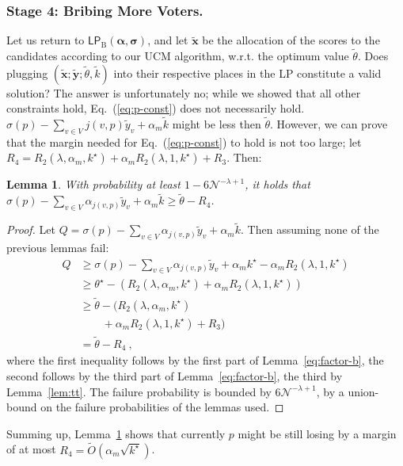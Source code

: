 \documentclass[letterpaper]{article} %
\newtheorem{lemma}[theorem]{Lemma}
\theoremstyle{definition}
\newcommand{\NN}{\mathcal{N}}
\newcommand\vecc{\mathbf}
\newcommand\vecgreek{\bm}
\newcommand{\veca}{\vecgreek{\alpha}}
\newcommand{\vecs}{\vecgreek{\sigma}}
\newcommand{\LPB}{\mathsf{LP}_{\mathrm{B}}}
\begin{document}
\subsubsection{Stage 4: Bribing More Voters.} Let us return to $\LPB(\veca,\vecs)$, and let $\vecc{\tilde{x}}$ be the allocation of the scores to the candidates according to our UCM algorithm, w.r.t. the optimum value $\tilde{\theta}$.
Does plugging $(\vecc{\tilde{x}};\vecc{\tilde{y}};\tilde{\theta}, \tilde{k})$ into their respective places in the LP constitute a valid solution? The answer is unfortunately no; while we showed that all other constraints hold, Eq.~(\ref{eq:p-const}) does not necessarily hold.
$\sigma(p) - \sum_{v \in V}j(v,p) \tilde{y}_{v} + \alpha_m \tilde{k}$ might be less then $\tilde{\theta}$.
However, we can prove that the margin needed for Eq.~(\ref{eq:p-const}) to hold is not too large; let $R_4 = R_2(\lambda, \alpha_{m},k^\star)
 +  \alpha_{m}R_2(\lambda, 1,k^\star) + 	R_3$. Then:
\begin{lemma}\label{lem:margin}
	With probability at least $1-6 \NN^{-\lambda + 1}$, it holds that $\sigma(p) - \sum_{v \in V}\alpha_{j(v,p)} \tilde{y}_{v} + \alpha_m\tilde{k} \geq \tilde{\theta}-R_4$.
\end{lemma}
\begin{proof}
	Let $Q=\sigma(p) - \sum_{v \in V}\alpha_{j(v,p)} \tilde{y}_{v} + \alpha_m\tilde{k}$. Then assuming none of the previous lemmas fail:
	\begin{align*}
	Q&\geq \sigma(p) - \sum_{v \in V}\alpha_{j(v,p)} \tilde{y}_{v}+ \alpha_m k^\star- \alpha_{m} R_2(\lambda, 1,k^\star)\\
	&\geq \theta^\star  - (R_2(\lambda, \alpha_{m},k^\star) +  \alpha_{m}R_2(\lambda, 1,k^\star))\\
	&\geq \tilde{\theta}  - (R_2(\lambda, \alpha_{m},k^\star)\\
	&\qquad +  \alpha_{m}R_2(\lambda, 1,k^\star) + 	R_3)\\
	&=\tilde{\theta}  - R_4\ ,
	\end{align*}
	where the first inequality follows by  the first part of Lemma~\ref{eq:factor-b}, the second follows by the third part of Lemma~\ref{eq:factor-b}, the third by Lemma~\ref{lem:tt}. The failure probability is bounded by $6 \NN^{-\lambda + 1}$, by a union-bound on the failure probabilities of the lemmas used.
\end{proof}
Summing up, Lemma~\ref{lem:margin} shows that currently $p$ might be still losing by a margin of  at most $R_4=\widetilde{O}(\alpha_m\sqrt{k^\star})$.
\end{document}
